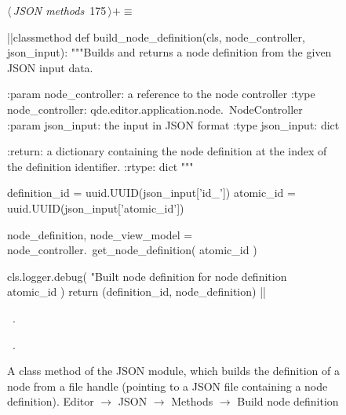 \documentclass[%
    a4paper,    %
    justified,  %
    nobib,      %
    openany     %
]{tufte-book}
\makeatletter
\renewcommand{\label}[1]{\@tufte@label{##1}}%
\makeatother
\begin{document}
\begin{figure}[!htbp]
\begin{flushleft} \small
\begin{minipage}{\linewidth}\label{scrap146}\raggedright\small
{} $\langle\,${\itshape JSON methods}\nobreak\ {\footnotesize {175}}$\,\rangle+\equiv$
\vspace{-1ex}
\begin{pythoncode}
|\normalfont{}\fontfamily{}|classmethod
def build_node_definition(cls, node_controller, json_input):
    """Builds and returns a node definition from the given JSON
    input data.

    :param node_controller: a reference to the node controller
    :type  node_controller: qde.editor.application.node.\
                            NodeController
    :param json_input: the input in JSON format
    :type  json_input: dict

    :return: a dictionary containing the node definition at the
             index of the definition identifier.
    :rtype:  dict
    """

    definition_id   = uuid.UUID(json_input['id_'])
    atomic_id       = uuid.UUID(json_input['atomic_id'])

    node_definition, node_view_model = node_controller.\
        get_node_definition(
                atomic_id
    )

    cls.logger.debug(
        "Built node definition for node definition %
        atomic_id
    )
    return (definition_id, node_definition)
|\NWsep|
\end{pythoncode}
\vspace{1.5ex}
\footnotesize
\begin{list}{}{\setlength{\itemsep}{-\parsep}\setlength{\itemindent}{-\leftmargin}}
\item \NWtxtMacroDefBy\ .
\item \NWtxtMacroRefIn\ \NWlink{nuweb218b}{218b}.

\item{}
\end{list}
\end{minipage}\vspace{4ex}
\end{flushleft}
\caption{A class method of the JSON module, which builds the definition of a node
  from a file handle (pointing to a JSON file containing a node
  definition).
  \newline{}\newline{}Editor $\rightarrow$ JSON $\rightarrow$
  Methods $\rightarrow$ Build node definition}
\end{figure}
\end{document}
